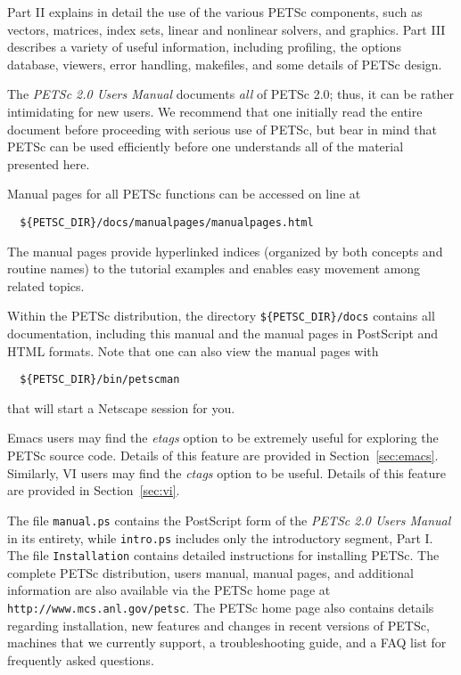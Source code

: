 Part II explains in detail the use of the various PETSc components,
such as vectors, matrices, index sets, linear and nonlinear
solvers, and graphics.  Part III describes a variety of useful
information, including profiling, the options database, viewers, error
handling, makefiles, and some details of
PETSc design.

\nocite{efficient}

The {\em PETSc 2.0 Users Manual} documents {\em all} of PETSc 2.0; thus,
it can be rather intimidating for new users. We recommend that one initially
read the entire document before proceeding with serious use of PETSc,
but bear in mind that PETSc can be used efficiently
before one understands all of the material presented here. 

\medskip \medskip

Manual pages for all PETSc functions can be
accessed on line at
\begin{verbatim}
  ${PETSC_DIR}/docs/manualpages/manualpages.html
\end{verbatim}
The manual pages
provide hyperlinked indices (organized by
both concepts and routine names) to the tutorial examples and enables
easy movement among related topics.  

Within the PETSc distribution, the directory
{\tt \$\{PETSC\_DIR\}/docs} contains all documentation, including this
manual and the manual pages in PostScript and HTML
formats. Note that one can also view the manual pages with
\begin{verbatim}
  ${PETSC_DIR}/bin/petscman
\end{verbatim}
that will start a Netscape session for you.

Emacs users may find the
{\em etags} option to be extremely useful for exploring the PETSc
source code.  Details of this feature are provided in
Section~\ref{sec:emacs}. Similarly, VI users may find the
{\em ctags} option to be useful. Details of this 
feature are provided in Section~\ref{sec:vi}.

The file {\tt manual.ps} contains the PostScript form of
the {\em PETSc 2.0 Users Manual} in its entirety, while {\tt intro.ps} 
includes only the introductory segment, Part I.   
The file {\tt Installation} contains detailed instructions for
installing PETSc. The complete PETSc distribution, users
manual, manual pages, and additional information are also available via
the PETSc home page at
{\tt http://www.mcs.anl.gov/petsc}.  The PETSc home page also
contains details regarding installation, new features and changes in recent
versions of PETSc, machines that we currently support, a
troubleshooting guide, and a FAQ list for frequently asked questions.

